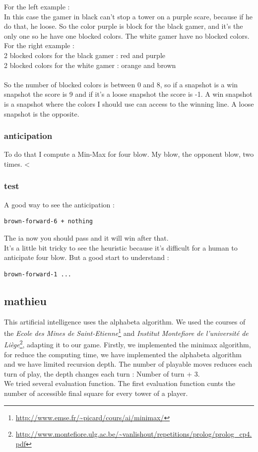 \documentclass[a4paper, 11pt]{article}
\begin{document}
For the left example :\\
In this case the gamer in black can't stop a tower on a purple scare, because if he do that, he loose. So the color purple is block for the black gamer, and it's the only one so he have one blocked colors. The white gamer have no blocked colors.\\
For the right example :\\
2 blocked colors for the black gamer : red and purple\\
2 blocked colors for the white gamer : orange and brown\\\\
So the number of blocked colors is between 0 and 8, so if a snapshot is a win snapshot the score is 9 and if it's a loose snapshot the score is -1. A win snapshot is a snapshot where the colors I should use can access to the winning line. A loose snapshot is the opposite.

\subsubsection{anticipation}
To do that I compute a Min-Max for four blow. My blow, the opponent blow, two times.
<
\subsubsection{test}
A good way to see the anticipation :
\begin{verbatim}
brown-forward-6 + nothing
\end{verbatim}
The ia now you should pass and it will win after that.\\

It's a little bit tricky to see the heuristic because it's difficult for a human to anticipate four blow. But a good start to understand :
\begin{verbatim}
brown-forward-1 ...
\end{verbatim}

\subsection{mathieu}
This artificial intelligence uses the alphabeta algorithm. We used the courses of the \emph{Ecole des Mines de Saint-Etienne}\footnote{\url{http://www.emse.fr/~picard/cours/ai/minimax/}} and \emph{Institut Montefiore de l'université de Liège}\footnote{\url{http://www.montefiore.ulg.ac.be/~vanlishout/repetitions/prolog/prolog_cp4.pdf}}, adapting it to our game. Firstly, we implemented the minimax algorithm, for reduce the computing time, we have implemented the alphabeta algorithm and we have limited recursion depth. The number of playable moves reduces each turn of play, the depth changes each turn : Number of turn + 3. \\
We tried several evaluation function.
The first evaluation function cunts the number of accessible final square for every tower of a player. 
\end{document}
